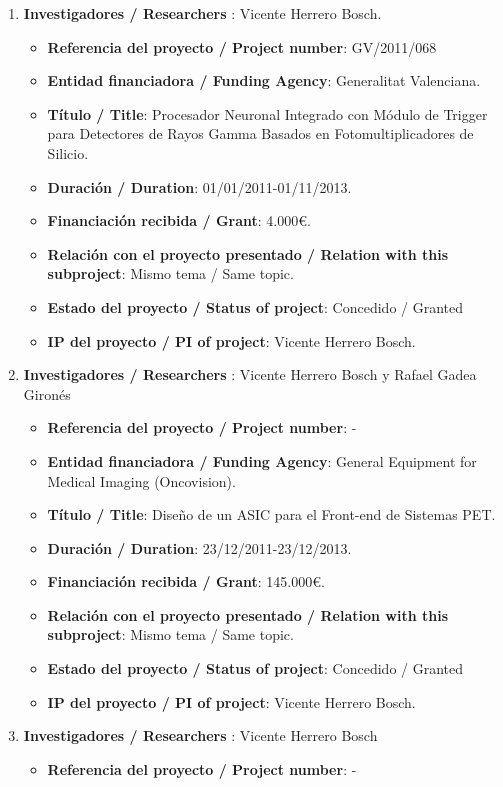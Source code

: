 \begin{enumerate}
\begin{itemize}
\end{itemize}
\item {\bf Investigadores / Researchers }: Vicente Herrero Bosch.
\begin{itemize}
\item {\bf Referencia del proyecto / Project number}: GV/2011/068
\item {\bf Entidad financiadora / Funding Agency}: Generalitat Valenciana.
\item {\bf Título / Title}:  Procesador Neuronal Integrado con Módulo de Trigger para Detectores de Rayos Gamma Basados en Fotomultiplicadores de Silicio.
\item {\bf Duraci\'on / Duration}: 01/01/2011-01/11/2013. 
\item {\bf Financiación recibida / Grant}: 4.000\euro. 
\item {\bf Relación con el proyecto presentado / Relation with this subproject}: Mismo tema / Same topic. 
\item {\bf Estado del proyecto / Status of project}: Concedido / Granted
\item {\bf IP del proyecto / PI of project}: Vicente Herrero Bosch.
\end{itemize}
\item {\bf Investigadores / Researchers }: Vicente Herrero Bosch y Rafael Gadea Gironés
\begin{itemize}
\item {\bf Referencia del proyecto / Project number}: -
\item {\bf Entidad financiadora / Funding Agency}: General Equipment for Medical Imaging (Oncovision).
\item {\bf Título / Title}:  Diseño de un ASIC para el Front-end de Sistemas PET.
\item {\bf Duraci\'on / Duration}: 23/12/2011-23/12/2013. 
\item {\bf Financiación recibida / Grant}: 145.000\euro. 
\item {\bf Relación con el proyecto presentado / Relation with this subproject}: Mismo tema / Same topic. 
\item {\bf Estado del proyecto / Status of project}: Concedido / Granted
\item {\bf IP del proyecto / PI of project}: Vicente Herrero Bosch.
\end{itemize}
\item {\bf Investigadores / Researchers }: Vicente Herrero Bosch 
\begin{itemize}
\item {\bf Referencia del proyecto / Project number}: -

\end{itemize}
\end{enumerate}

